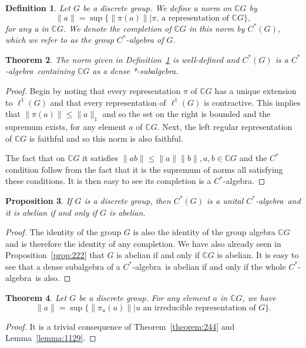\documentclass{book}
\newtheorem{definition}{Definition}[section]
\newtheorem{proposition}[definition]{Proposition}
\newtheorem{theorem}[definition]{Theorem}
\def\cstar{\(C^*\)-algebra}
\begin{document}
\begin{definition}\label{def:245}
  Let \(G\) be a discrete group. We define a norm on \(\mathbb{C}G\) by
  \[\|a\| = \sup\{\|\pi(a)\| | \pi\mbox{, a representation of }\mathbb{C}G\},\]
  for any a in \(\mathbb{C}G\). We denote the completion of \(\mathbb{C}G\) in this norm by \(C^*(G)\),
  which we refer to as the \textnormal{group \cstar} of \(G\).
\end{definition}
\begin{theorem}
  The norm given in Definition~\ref{def:245} is well-defined and
  \(C^*(G)\) is a \cstar\ containing \(\mathbb{C}G\) as a dense *-subalgebra.
\end{theorem}
\begin{proof}
  Begin by noting that every representation \(\pi\) of \(\mathbb{C}G\) has a unique 
  extension to \(\ell^1(G)\) and that every representation of \(\ell^1(G)\) is contractive. This
  implies that \(\|\pi(a)\| \leq \|a\|_1\) and so the set on the right is bounded and the
  supremum exists, for any element \(a\) of \(\mathbb{C}G\). Next, the left regular 
  representation of \(\mathbb{C}G\) is faithful and so this norm is also faithful.\par
  The fact that on \(\mathbb{C}G\) it satisfies \(\|ab\| \leq \|a\| \|b\| , a,b \in \mathbb{C}G\) and the \(C^*\)
  condition follow from the fact that it is the supremum of norms all satisfying
  these conditions. It is then easy to see its completion is a \cstar.
\end{proof}
\begin{proposition}
  If \(G\) is a discrete group, then \(C^*(G)\) is a unital \cstar\ and it is abelian if and only if \(G\) is abelian.
\end{proposition}
\begin{proof}
  The identity of the group \(G\) is also the identity of the group algebra
  \(\mathbb{C}G\) and is therefore the identity of any completion. We have also already
  seen in Proposition~\ref{prop:222} that \(G\) is abelian if and only if \(\mathbb{C}G\) is abelian. It is
  easy to see that a dense subalgebra of a \cstar\ is abelian if and only if
  the whole \cstar\ is also.
\end{proof}
\begin{theorem}
  Let \(G\) be a discrete group. For any element \(a\) in \(\mathbb{C}G\), we
  have
  \[
  \|a\| = \sup\{\|\pi_u(a)\| | u\mbox{ an irreducible representation of }G\}.
  \]
\end{theorem}
\begin{proof}
  It is a trivial consequence of Theorem~\ref{theorem:244} and
  Lemma~\ref{lemma:1129}.
\end{proof}
\end{document}
